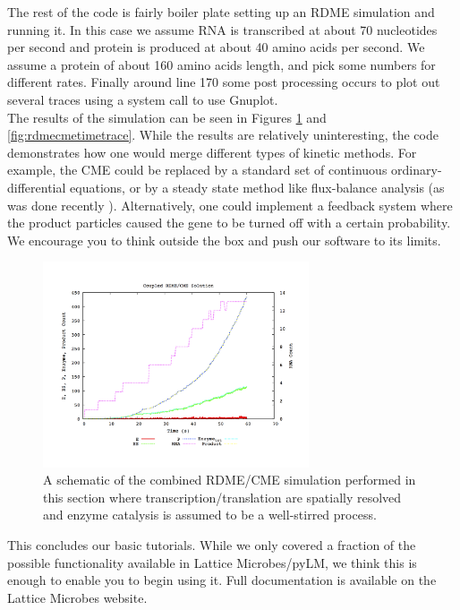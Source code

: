 The rest of the code is fairly boiler plate setting up an RDME simulation and running it.  In this case we assume RNA is transcribed at about 70 nucleotides per second and protein is produced at about 40 amino acids per second.  We assume a protein of about 160 amino acids length, and pick some numbers for different rates.  Finally around line 170 some post processing occurs to plot out several traces using a system call to use Gnuplot.  \\

The results of the simulation can be seen in Figures \ref{fig:rdmecmecoupled} and \ref{fig:rdmecmetimetrace}.  While the results are relatively uninteresting, the code demonstrates how one would merge different types of kinetic methods.  For example, the CME could be replaced by a standard set of continuous ordinary-differential equations, or by a steady state method like flux-balance analysis (as was done recently \cite[Chapter~13]{BookChapter}).  Alternatively, one could implement a feedback system where the product particles caused the gene to be turned off with a certain probability. We encourage you to think outside the box and push our software to its limits. \\


\begin{figure}[h!]
  \centering
        \includegraphics[width=0.7\textwidth]{Figures/Coupled.png}
        \caption{A schematic of the combined RDME/CME simulation performed in this section where transcription/translation are spatially resolved and enzyme catalysis is assumed to be a well-stirred process.} \label{fig:rdmecmecoupled}
\end{figure}

This concludes our basic tutorials.  While we only covered a fraction of the possible functionality available in Lattice Microbes/pyLM, we think this is enough to enable you to begin using it.  Full documentation is available on the Lattice Microbes website. \\

